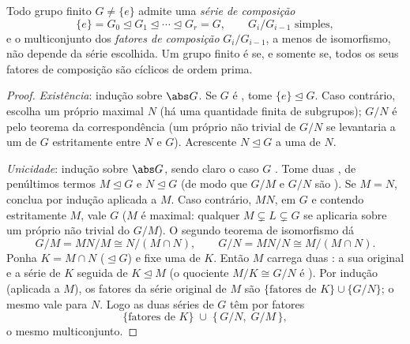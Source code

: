 \begin{theorem}\label{thm:b3:groups:jordanholder}
Todo grupo finito $G \neq \{e\}$ admite uma \emph{série de
composição}
\[
\{e\} = G_0 \trianglelefteq G_1 \trianglelefteq \cdots
\trianglelefteq G_r = G,
\qquad G_{i}/G_{i-1} \text{ simples},
\]
e o multiconjunto dos \emph{fatores de composição} $G_i/G_{i-1}$, a menos de
isomorfismo, não depende da série escolhida. Um grupo finito é 
se, e somente se, todos os seus fatores de composição são cíclicos de
ordem prima.
\end{theorem}

\begin{proof}
\emph{Existência}: indução sobre $\abs G$. Se $G$ é ,
tome $\{e\} \trianglelefteq G$. Caso contrário, escolha um  próprio maximal
$N$ (há uma quantidade finita de subgrupos); $G/N$ é 
pelo teorema da correspondência (um  próprio não trivial
de $G/N$ se levantaria a um  de $G$ estritamente
entre $N$ e $G$). Acrescente $N \trianglelefteq G$ a uma  de
$N$.

\emph{Unicidade}: indução sobre $\abs G$, sendo claro o caso
$G$ . Tome duas , de penúltimos termos
$M \trianglelefteq G$ e $N \trianglelefteq G$ (de modo que $G/M$ e $G/N$ são ). Se
$M = N$, conclua por indução aplicada a $M$. Caso contrário,
$MN$,  em $G$ e contendo estritamente $M$, vale
$G$ ($M$ é  maximal: qualquer $M \subsetneq L
\subsetneq G$  se aplicaria
sobre um  próprio não trivial do 
$G/M$). O segundo teorema de isomorfismo dá
\[
G/M = MN/M \cong N/(M \cap N),
\qquad
G/N = MN/N \cong M/(M \cap N).
\]
Ponha $K = M \cap N$ ($\trianglelefteq G$) e fixe uma  de $K$. Então
$M$ carrega duas : a sua original e a série de
$K$ seguida de $K \trianglelefteq
M$ (o quociente $M/K \cong G/N$ é ). Por indução
(aplicada a $M$), os fatores da série original de $M$ são $\{\text{fatores de } K\} \cup \{G/N\}$;
o mesmo vale para $N$. Logo as duas séries de $G$ têm por
fatores
\[
\{\text{fatores de } K\} \;\cup\; \{\,G/N,\; G/M\,\},
\]
o mesmo multiconjunto.


\end{proof}
